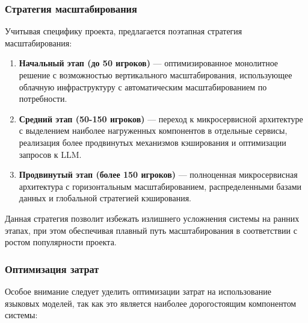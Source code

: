 \subsubsection{Стратегия масштабирования}

Учитывая специфику проекта, предлагается поэтапная стратегия масштабирования:

\begin{enumerate}
    \item \textbf{Начальный этап (до 50 игроков)} — оптимизированное монолитное решение с возможностью вертикального масштабирования, использующее облачную инфраструктуру с автоматическим масштабированием по потребности.

    \item \textbf{Средний этап (50-150 игроков)} — переход к микросервисной архитектуре с выделением наиболее нагруженных компонентов в отдельные сервисы, реализация более продвинутых механизмов кэширования и оптимизации запросов к LLM.

    \item \textbf{Продвинутый этап (более 150 игроков)} — полноценная микросервисная архитектура с горизонтальным масштабированием, распределенными базами данных и глобальной стратегией кэширования.
\end{enumerate}

Данная стратегия позволит избежать излишнего усложнения системы на ранних этапах, при этом обеспечивая плавный путь масштабирования в соответствии с ростом популярности проекта.

\subsubsection{Оптимизация затрат}

Особое внимание следует уделить оптимизации затрат на использование языковых моделей, так как это является наиболее дорогостоящим компонентом системы:

